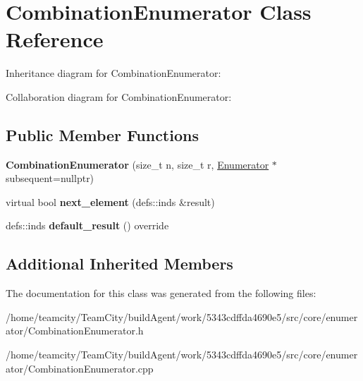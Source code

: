 \hypertarget{classCombinationEnumerator}{}\section{Combination\+Enumerator Class Reference}
\label{classCombinationEnumerator}


Inheritance diagram for Combination\+Enumerator\+:


Collaboration diagram for Combination\+Enumerator\+:
\subsection*{Public Member Functions}
\begin{DoxyCompactItemize}
\item 
{\bfseries Combination\+Enumerator} (size\+\_\+t n, size\+\_\+t r, \hyperlink{classEnumerator}{Enumerator} $\ast$subsequent=nullptr)\hypertarget{classCombinationEnumerator_a26b255c3e1743191189c68cff3a93120}{}\label{classCombinationEnumerator_a26b255c3e1743191189c68cff3a93120}

\item 
virtual bool {\bfseries next\+\_\+element} (defs\+::inds \&result)\hypertarget{classCombinationEnumerator_a7e9a1848cae9ef46a65883b47f76d994}{}\label{classCombinationEnumerator_a7e9a1848cae9ef46a65883b47f76d994}

\item 
defs\+::inds {\bfseries default\+\_\+result} () override\hypertarget{classCombinationEnumerator_aec8be6907ffc568e9d665184630f0d5e}{}\label{classCombinationEnumerator_aec8be6907ffc568e9d665184630f0d5e}

\end{DoxyCompactItemize}
\subsection*{Additional Inherited Members}


The documentation for this class was generated from the following files\+:\begin{DoxyCompactItemize}
\item 
/home/teamcity/\+Team\+City/build\+Agent/work/5343cdffda4690e5/src/core/enumerator/Combination\+Enumerator.\+h\item 
/home/teamcity/\+Team\+City/build\+Agent/work/5343cdffda4690e5/src/core/enumerator/Combination\+Enumerator.\+cpp\end{DoxyCompactItemize}

